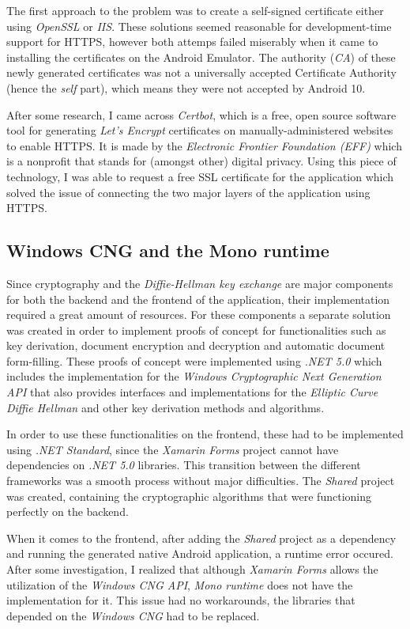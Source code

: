 The first approach to the problem was to create a self-signed certificate either using \emph{OpenSSL} or \emph{IIS}.
These solutions seemed reasonable for development-time support for HTTPS, however both attemps failed miserably when it came to installing the
certificates on the Android Emulator. 
The authority (\emph{CA}) of these newly generated certificates was not a universally accepted Certificate Authority (hence the \emph{self} part), which means
they were not accepted by Android 10.

After some research, I came across \emph{Certbot}, which is a free, open source software tool for generating \emph{Let's Encrypt} certificates on
manually-administered websites to enable HTTPS.
It is made by the \emph{Electronic Frontier Foundation (EFF)} which is a nonprofit that stands for (amongst other) digital privacy.
Using this piece of technology, I was able to request a free SSL certificate for the application which solved the issue of connecting the two major layers
of the application using HTTPS.

\subsection{Windows CNG and the Mono runtime}

Since cryptography and the \emph{Diffie-Hellman key exchange} are major components for both the backend and the frontend of the application,
their implementation required a great amount of resources.
For these components a separate solution was created in order to implement proofs of concept for functionalities such as key derivation, 
document encryption and decryption and automatic document form-filling.
These proofs of concept were implemented using \emph{.NET 5.0} which includes the implementation for the \emph{Windows Cryptographic Next Generation API} that
also provides interfaces and implementations for the \emph{Elliptic Curve Diffie Hellman} and other key derivation methods and algorithms.

In order to use these functionalities on the frontend, these had to be implemented using \emph{.NET Standard}, since the \emph{Xamarin Forms} project
cannot have dependencies on \emph{.NET 5.0} libraries.
This transition between the different frameworks was a smooth process without major difficulties.
The \emph{Shared} project was created, containing the cryptographic algorithms that were functioning perfectly on the backend.

When it comes to the frontend, after adding the \emph{Shared} project as a dependency and running the generated native Android application, a runtime error occured.
After some investigation, I realized that although \emph{Xamarin Forms} allows the utilization of the \emph{Windows CNG API}, \emph{Mono runtime} does not have the implementation for it.
This issue had no workarounds, the libraries that depended on the \emph{Windows CNG} had to be replaced.

